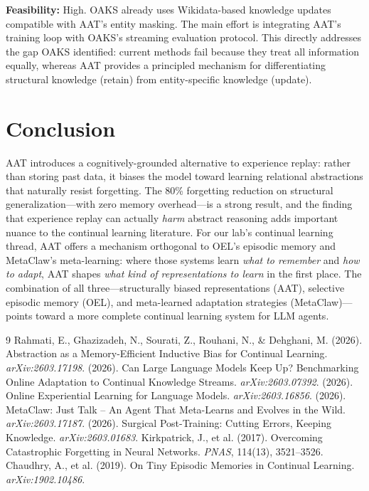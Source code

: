 \documentclass[11pt]{article}
\begin{document}
\textbf{Feasibility:} High. OAKS already uses Wikidata-based knowledge updates compatible with AAT's entity masking. The main effort is integrating AAT's training loop with OAKS's streaming evaluation protocol. This directly addresses the gap OAKS identified: current methods fail because they treat all information equally, whereas AAT provides a principled mechanism for differentiating structural knowledge (retain) from entity-specific knowledge (update).

\section{Conclusion}

AAT introduces a cognitively-grounded alternative to experience replay: rather than storing past data, it biases the model toward learning relational abstractions that naturally resist forgetting. The 80\% forgetting reduction on structural generalization---with zero memory overhead---is a strong result, and the finding that experience replay can actually \textit{harm} abstract reasoning adds important nuance to the continual learning literature. For our lab's continual learning thread, AAT offers a mechanism orthogonal to OEL's episodic memory and MetaClaw's meta-learning: where those systems learn \textit{what to remember} and \textit{how to adapt}, AAT shapes \textit{what kind of representations to learn} in the first place. The combination of all three---structurally biased representations (AAT), selective episodic memory (OEL), and meta-learned adaptation strategies (MetaClaw)---points toward a more complete continual learning system for LLM agents.

\begin{thebibliography}{9}
 Rahmati, E., Ghazizadeh, N., Sourati, Z., Rouhani, N., \& Dehghani, M. (2026). Abstraction as a Memory-Efficient Inductive Bias for Continual Learning. \textit{arXiv:2603.17198}.
 (2026). Can Large Language Models Keep Up? Benchmarking Online Adaptation to Continual Knowledge Streams. \textit{arXiv:2603.07392}.
 (2026). Online Experiential Learning for Language Models. \textit{arXiv:2603.16856}.
 (2026). MetaClaw: Just Talk -- An Agent That Meta-Learns and Evolves in the Wild. \textit{arXiv:2603.17187}.
 (2026). Surgical Post-Training: Cutting Errors, Keeping Knowledge. \textit{arXiv:2603.01683}.
 Kirkpatrick, J., et al. (2017). Overcoming Catastrophic Forgetting in Neural Networks. \textit{PNAS}, 114(13), 3521--3526.
 Chaudhry, A., et al. (2019). On Tiny Episodic Memories in Continual Learning. \textit{arXiv:1902.10486}.
\end{thebibliography}
\end{document}
